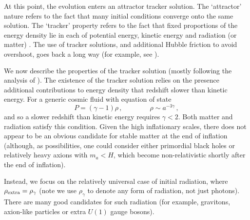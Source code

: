 At this point, the evolution enters an attractor tracker solution. The `attractor' nature refers to the fact that many initial conditions converge onto the same solution. The `tracker' property refers to the fact that
fixed proportions of the energy density lie in each of potential energy, kinetic energy and radiation (or matter) \cite{Wetterich:1987fm, Ferreira:1997hj, Copeland:1997et}. The use of tracker solutions, and additional Hubble friction to avoid overshoot, goes back a long way (for example, see  \cite{hepth9805005, hepth0001112, hepph0010102, Barreiro:2005ua, hepth0408160, hepth0505098}).

We now describe the properties of the tracker solution (mostly following the analysis of \cite{Copeland:1997et}).
The existence of the tracker solution relies on the presence additional contributions to energy density that redshift slower than kinetic energy.
For a generic cosmic fluid with equation of state 
\begin{equation}
P= (\gamma - 1) \rho\,, \qquad \qquad \rho \sim a^{-3 \gamma}\,,
\end{equation}
and so a slower redshift than kinetic energy requires $\gamma < 2$. Both matter and radiation satisfy this condition. Given the high inflationary scales, there does not appear to be an obvious candidate for stable matter at the end of inflation (although, as possibilities, one could consider either primordial black holes or relatively heavy axions with $m_a < H$, which become non-relativistic shortly after the end of inflation).

Instead,  we focus on the relatively universal case of initial radiation, where $\rho_{\rm extra} = \rho_\gamma$ (note we use $\rho_\gamma$ to denote any form of radiation, not just photons). There are many good candidates for such radiation (for example, gravitons, axion-like particles or extra $U(1)$ gauge bosons).

